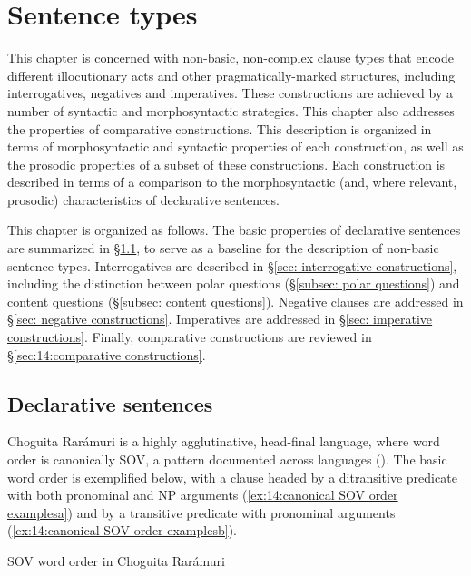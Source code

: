 \chapter{Sentence types}
\label{chap: sentence types}
\largerpage
This chapter is concerned with non-basic, non-complex clause types that encode different illocutionary acts and other pragmatically-marked structures, including interrogatives, negatives and imperatives. These constructions are achieved by a number of syntactic and morphosyntactic strategies. This chapter also addresses the properties of comparative constructions. This description is organized in terms of morphosyntactic and syntactic properties of each construction, as well as the prosodic properties of a subset of these constructions. Each construction is described in terms of a comparison to the morphosyntactic (and, where relevant, prosodic) characteristics of declarative sentences.

This chapter is organized as follows. The basic properties of declarative sentences are summarized in §\ref{sec: declarative sentences}, to serve as a baseline for the description of non-basic sentence types. Interrogatives are described in §\ref{sec: interrogative constructions}, including the distinction between polar questions (§\ref{subsec: polar questions}) and content questions (§\ref{subsec: content questions}). Negative clauses are addressed in §\ref{sec: negative constructions}. Imperatives are addressed in §\ref{sec: imperative constructions}. Finally, comparative constructions are reviewed in §\ref{sec:14:comparative constructions}.


\section{Declarative sentences}
\label{sec: declarative sentences}

Choguita Rarámuri is a highly agglutinative, head-final language, where word order is canonically SOV, a pattern documented across  languages (\citealt{langacker1977uto}). The basic word order is exemplified below, with a clause headed by a ditransitive predicate with both pronominal and NP arguments (\ref{ex:14:canonical SOV order examplesa}) and by a transitive predicate with pronominal arguments (\ref{ex:14:canonical SOV order examplesb}).

\ea\label{ex:14:canonical SOV order examples}
{SOV word order in Choguita Rarámuri}

